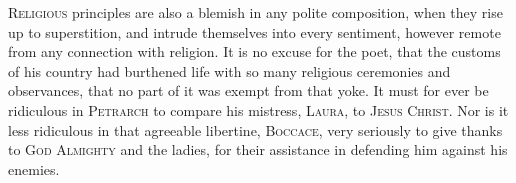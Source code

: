 \textsc{Religious} principles are also a blemish in any polite
composition, when they rise up to superstition, and intrude themselves
into every sentiment, however remote from any connection with
religion. It is no excuse for the poet, that the customs of his
country had burthened life with so many religious ceremonies and
observances, that no part of it was exempt from that yoke. It must for
ever be ridiculous in \textsc{Petrarch} to compare his mistress,
\textsc{Laura}, to \textsc{Jesus Christ}. Nor is it less ridiculous in
that agreeable libertine, \textsc{Boccace}, very seriously to give
thanks to \textsc{God Almighty} and the ladies, for their assistance
in defending him against his enemies.

